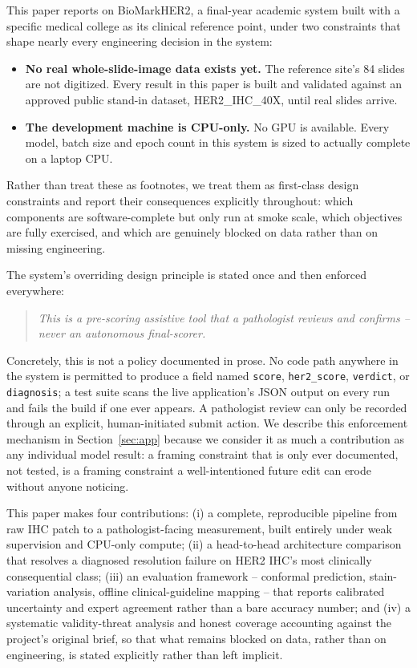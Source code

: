 \documentclass[conference]{IEEEtran}
\begin{document}
This paper reports on BioMarkHER2, a final-year academic system built with
a specific medical college as its clinical reference point, under two
constraints that shape nearly every engineering decision in the system:

\begin{itemize}
\item \textbf{No real whole-slide-image data exists yet.} The reference
  site's 84 slides are not digitized. Every result in this paper is built
  and validated against an approved public stand-in dataset,
  HER2\_IHC\_40X, until real slides arrive.
\item \textbf{The development machine is CPU-only.} No GPU is available.
  Every model, batch size and epoch count in this system is sized to
  actually complete on a laptop CPU.
\end{itemize}

Rather than treat these as footnotes, we treat them as first-class design
constraints and report their consequences explicitly throughout: which
components are software-complete but only run at smoke scale, which
objectives are fully exercised, and which are genuinely blocked on data
rather than on missing engineering.

The system's overriding design principle is stated once and then enforced
everywhere:

\begin{quote}
\emph{This is a pre-scoring assistive tool that a pathologist reviews and
confirms -- never an autonomous final-scorer.}
\end{quote}

Concretely, this is not a policy documented in prose. No code path anywhere
in the system is permitted to produce a field named \texttt{score},
\texttt{her2\_score}, \texttt{verdict}, or \texttt{diagnosis}; a test suite
scans the live application's JSON output on every run and fails the build
if one ever appears. A pathologist review can only be recorded through an
explicit, human-initiated submit action. We describe this enforcement
mechanism in Section~\ref{sec:app} because we consider it as much a
contribution as any individual model result: a framing constraint that is
only ever documented, not tested, is a framing constraint a well-intentioned
future edit can erode without anyone noticing.

This paper makes four contributions: (i) a complete, reproducible pipeline
from raw IHC patch to a pathologist-facing measurement, built entirely
under weak supervision and CPU-only compute; (ii) a head-to-head
architecture comparison that resolves a diagnosed resolution failure on
HER2 IHC's most clinically consequential class; (iii) an evaluation
framework -- conformal prediction, stain-variation analysis, offline
clinical-guideline mapping -- that reports calibrated uncertainty and
expert agreement rather than a bare accuracy number; and (iv) a systematic
validity-threat analysis and honest coverage accounting against the
project's original brief, so that what remains blocked on data, rather
than on engineering, is stated explicitly rather than left implicit.
\end{document}
